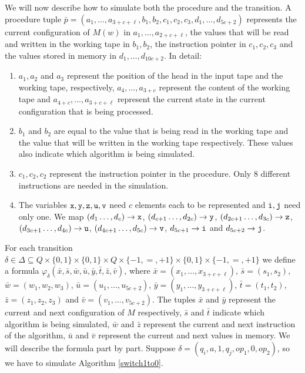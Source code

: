 We will now describe how to simulate both the procedure and the transition. A procedure tuple $\bar{p} = (a_1,\ldots,a_{3+c+\ell},b_1,b_2,c_1,c_2,c_3,d_1,\ldots,d_{5c+2})$ represents the current configuration of $M(w)$ in $a_1,\ldots,a_{2+c+\ell}$, the values that will be read and written in the working tape in $b_1,b_2$, the instruction pointer in $c_1,c_2,c_3$ and the values stored in memory in $d_1,\ldots,d_{10c+2}$. In detail:
\begin{enumerate}
	\item $a_1,a_2$ and $a_3$ represent the position of the head in the input tape and the working tape, respectively, $a_4,\ldots,a_{3+c}$ represent the content of the working tape and $a_{4+c},\ldots,a_{3+c+\ell}$ represent the current state in the current configuration that is being processed.
	\item $b_1$ and $b_2$ are equal to the value that is being read in the working tape and the value that will be written in the working tape respectively. These values also indicate which algorithm is being simulated.
	\item $c_1,c_2,c_2$ represent the instruction pointer in the procedure. Only 8 different instructions are needed in the simulation.
	\item The variables $\mathtt{x},\mathtt{y},\mathtt{z},\mathtt{u},\mathtt{v}$ need $c$ elements each to be represented and $\mathtt{i},\mathtt{j}$ need only one. We map $(d_1\ldots,d_{c}) \to \mathtt{x}$, $(d_{c+1}\ldots,d_{2c}) \to \mathtt{y}$,
	$(d_{2c+1}\ldots,d_{3c}) \to \mathtt{z}$, $(d_{3c+1}\ldots,d_{4c}) \to \mathtt{u}$,
	$(d_{4c+1}\ldots,d_{5c}) \to \mathtt{v}$, $d_{5c+1} \to \mathtt{i}$ and $d_{5c+2}\to \mathtt{j}$.
\end{enumerate}
For each transition $\delta \in \Delta \subseteq Q \times \{0,1\} \times \{0,1\} \times Q \times \{-1,=,+1\} \times \{0,1\} \times \{-1,=,+1\}$ we define a formula $\varphi_{\delta}(\bar{x},\bar{s},\bar{w},\bar{u},\bar{y},\bar{t},\bar{z},\bar{v})$, where $\bar{x} = (x_1,\ldots,x_{3+c+\ell})$, $\bar{s} = (s_1,s_2)$, $\bar{w} = (w_1,w_2,w_3)$, $\bar{u} = (u_1,\ldots,u_{5c+2})$, $\bar{y} = (y_1,\ldots,y_{3+c+\ell})$, $\bar{t} = (t_1,t_2)$, $\bar{z} = (z_1,z_2,z_3)$ and $\bar{v} = (v_1,\ldots,v_{5c+2})$. The tuples $\bar{x}$ and $\bar{y}$ represent the current and next configuration of $M$ respectively, $\bar{s}$ and $\bar{t}$ indicate which algorithm is being simulated, $\bar{w}$ and $\bar{z}$ represent the current and next instruction of the algorithm, $\bar{u}$ and $\bar{v}$ represent the current and next values in memory. We will describe the formula part by part. Suppose $\delta = (q_i,a,1,q_j,op_1,0,op_2)$, so we have to simulate Algorithm \ref{switch1to0}.

